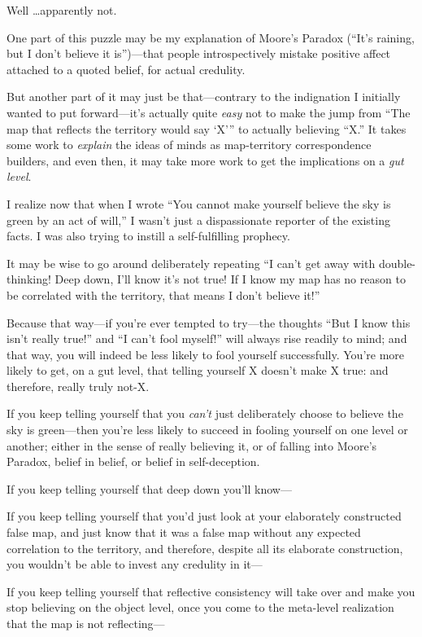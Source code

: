 {
 Well \ldots apparently not.}

{
 One part of this puzzle may be my explanation of
Moore's Paradox
(``It's raining, but I
don't believe it is'')---that people
introspectively mistake positive affect attached to a quoted belief,
for actual credulity.}

{
 But another part of it may just be that---contrary to the
indignation I initially wanted to put forward---it's
actually quite \textit{easy} not to make the jump from
``The map that reflects the territory would say
`X''' to actually
believing ``X.'' It takes some work
to \textit{explain} the ideas of minds as map-territory correspondence
builders, and even then, it may take more work to get the implications
on a \textit{gut level}.}

{
 I realize now that when I wrote ``You cannot make
yourself believe the sky is green by an act of
will,'' I wasn't just a dispassionate
reporter of the existing facts. I was also trying to instill a
self-fulfilling prophecy.}

{
 It may be wise to go around deliberately repeating
``I can't get away with
double-thinking! Deep down, I'll know
it's not true! If I know my map has no reason to be
correlated with the territory, that means I don't
believe it!''}

{
 Because that way---if you're ever tempted to
try---the thoughts ``But I know this
isn't really true!'' and
``I can't fool
myself!'' will always rise readily to mind; and that
way, you will indeed be less likely to fool yourself successfully.
You're more likely to get, on a gut level, that telling
yourself X doesn't make X true: and therefore, really
truly not-X.}

{
 If you keep telling yourself that you
\textit{can't} just deliberately choose to believe the
sky is green---then you're less likely to succeed in
fooling yourself on one level or another; either in the sense of really
believing it, or of falling into Moore's Paradox,
belief in belief, or belief in self-deception.}

{
 If you keep telling yourself that deep down you'll
know---}

{
 If you keep telling yourself that you'd just look
at your elaborately constructed false map, and just know that it was a
false map without any expected correlation to the territory, and
therefore, despite all its elaborate construction, you
wouldn't be able to invest any credulity in it---}

{
 If you keep telling yourself that reflective consistency will take
over and make you stop believing on the object level, once you come to
the meta-level realization that the map is not reflecting---}

